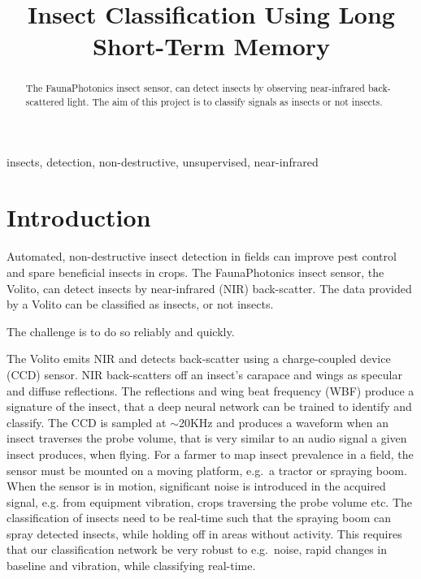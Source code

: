 \documentclass{article}
\title{Insect Classification Using Long Short-Term Memory}
\begin{document}
\maketitle

\begin{abstract}
The FaunaPhotonics insect sensor, can detect insects by observing near-infrared back-scattered light. 
The aim of this project is to classify signals as insects or not insects.
\end{abstract}
%
\begin{keywords}
insects, detection, non-destructive, unsupervised, near-infrared
\end{keywords}
%
\section{Introduction}
\label{sec:intro}

Automated, non-destructive insect detection in fields can improve pest control and spare beneficial insects in crops\cite{Kirkeby2021}.
The FaunaPhotonics insect sensor\cite{rydhmer2021automating}, the Volito, can detect insects by near-infrared (NIR) back-scatter.
The data provided by a Volito can be classified as insects, or not insects. 

The challenge is to do so reliably and quickly.

The Volito emits NIR and detects back-scatter using a charge-coupled device (CCD) sensor.
NIR back-scatters off an insect's carapace and wings as specular and diffuse reflections.
The reflections and wing beat frequency (WBF) produce a signature of the insect, that a deep neural network can be trained to identify and classify.
The CCD is sampled at $\sim$20KHz and produces a waveform when an insect traverses the probe volume, that is very similar to an audio signal a given insect produces, when flying. 
For a farmer to map insect prevalence in a field, the sensor must be mounted on a moving platform, e.g.\ a tractor or spraying boom.
When the sensor is in motion, significant noise is introduced in the acquired signal, e.g. from equipment vibration, crops traversing the probe volume etc.
The classification of insects need to be real-time such that the spraying boom can spray detected insects, while holding off in areas without activity.
This requires that our classification network be very robust to e.g.\ noise, rapid changes in baseline and vibration, while classifying real-time.









\end{document}
